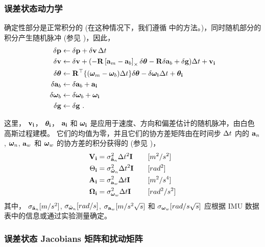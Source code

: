 \subsubsection{误差状态动力学}


确定性部分是正常积分的 (在这种情况下，我们遵循  中的方法。)，同时随机部分的积分产生随机脉冲 (参见 )，因此，
%
\begin{subequations}
%
\begin{align}
\delta{\bf p} &\gets \delta{\bf p} + \delta{\bf v}\,\Delta t \\
\delta{\bf v} &\gets \delta{\bf v} + (-{\bf R}\left[{\bf a}_{m}-{\bf a}_{b}\right]_\times\delta{\bm \theta} - {\bf R}\delta{\bf a}_{b} + \delta{\bf g})\Delta t + {\bf v}_{\bf i} \\
\delta{\bm \theta} &\gets {\bf R}^{\top}\{({\bm \omega}_{m}-{\bm \omega}_{b})\Delta t\}\delta{\bm \theta} - \delta{\bm \omega}_{b} \Delta t + {\bm \theta}_{\bf i} \\
\delta{\bf a}_{b} &\gets \delta{\bf a}_{b} + {\bf a}_{\bf i} \\
\delta{\bm \omega}_{b} &\gets \delta{\bm \omega}_{b} + {\bm \omega}_{\bf i} \\
\delta{\bf g} &\gets \delta{\bf g} ~.
\end{align}%
\end{subequations}

这里， ${\bf v}_{\bf i}$， ${\bm \theta}_{\bf i}$， ${\bf a}_{\bf i}$ 和 ${\bm \omega}_{\bf i}$ 是应用于速度、方向和偏差估计的随机脉冲，由白色高斯过程建模。 
它们的均值为零，并且它们的协方差矩阵由在时间步 $\Delta t$ 内的 ${\bf a}_n$, ${\bm \omega}_n$, ${\bf a}_w$ 和 ${\bm \omega}_w$ 的协方差的积分获得的  (参见 )，
%
%
\begin{align}
{\bf V}_{\bf i} &= \sigma_{\tilde{{\bf a}}_n}^2\Delta t^2{\bf I} \quad &&[m^2/s^2]\\
\Theta_{\bf i} &= \sigma_{\tilde{{\bm \omega}}_n}^2\Delta t^2{\bf I} \quad &&[rad^2] \\
{\bf A}_{\bf i} &= \sigma_{{\bf a}_w}^2\Delta t{\bf I} \quad &&[m^2/s^4] \\
{\bm \Omega}_{\bf i} &= \sigma_{{\bm \omega}_w}^2\Delta t{\bf I} \quad &&[rad^2/s^2] 
\end{align}%
%
其中， $\sigma_{\tilde{{\bf a}}_n}[m/s^2]$, $\sigma_{\tilde{{\bm \omega}}_n}[rad/s]$, $\sigma_{{\bf a}_w}[m/s^2\sqrt{s}]$ 和 $\sigma_{{\bm \omega}_w}[rad/s\sqrt{s}]$ 应根据 IMU 数据表中的信息或通过实验测量确定。



\subsubsection{误差状态 Jacobians 矩阵和扰动矩阵}


